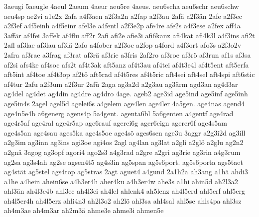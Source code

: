 {    3aeugi
    5aeugle
    4aeul
    2aeum
    4aeur
    aeu5re
    4aeus.
    aeu6scha
    aeu6schr
    aeu6schw
    aeu4sp
    ae2vi
    a1e2x
    2afa
    a4f3aen
    a2f3a2n
    a2fap
    a2f3au
    2afä
    a2f3än
    2afe
    a2f3ec
    a2f3ef
    a4f5einh
    a4f5einr
    afel3e
    a4fentl
    a2f3e2p
    afe4re
    afe2s
    a4f3ese
    a2fex
    aff4a
    3affär
    af4fei
    3affek
    af4flu
    aff2r
    2afi
    afi2e
    afie3i
    afi6kanz
    afi4kat
    afi4k3l
    a4f3ins
    afi2t
    2afl
    af3lae
    af3lau
    af3lä
    2afo
    a4fober
    a2f3oc
    a2fop
    a4ford
    a4f3ort
    afo3s
    a2f3o2v
    2afra
    af3rae
    a3frag
    af3rat
    af3rä
    af3rie
    a3fris
    2af2ro
    af3roe
    af3rö
    af3run
    af1s
    af3sa
    af2si
    afs4ke
    af4soc
    afs2t
    af4t3ak
    aft5anz
    af4t3au
    af4tei
    af4t3e4l
    af4t5ent
    aft5erfa
    aft5int
    af4toe
    af4t3op
    af2tö
    aft5rad
    af4t5res
    af4t5ric
    aft4sei
    aft4sel
    aft4spi
    aft6stic
    af4tur
    2afu
    a2f3um
    a2f3ur
    2afü
    2aga
    ag3a2d
    a2g3au
    ag3ärm
    agd3an
    ag4d3ar
    ag4del
    ag4det
    ag4din
    ag4dre
    ag4dro
    4age.
    ageb2
    age3id
    age5ind
    age5inf
    age5inh
    age5in4s
    2agel
    agel5d
    agelei6s
    a4gelem
    age4len
    age4ler
    4a5gen.
    age4nas
    agend4
    age4n5e4b
    a6generg
    agens4p
    5a4gent.
    agenta6bl
    5a6genten
    a4gentf
    age4rad
    age4r5af
    age4ral
    age4r5ap
    age6rauf
    agerei6g
    ager6eign
    agerer6f
    age4s5am
    age4s5an
    age4sau
    ages5ka
    age4s5oe
    age4sö
    ages6sen
    age3u
    3aggr
    a2g3i2d
    ag3ill
    a2g3im
    ag3inn
    ag3ins
    agi3oe
    agi4os
    2agl
    ag4lan
    ag3lat
    a2gli
    a2glö
    a2glu
    ag2n2
    a2gnä
    3agog
    ag3opf
    agori4
    ago2s3
    a4g3rad
    a2gre
    a2gri
    ag3rie
    ag3rin
    a4g3rum
    ag2sa
    ag3s4ah
    ag2se
    agsen4t5
    ag4s3in
    ag5span
    ag5s6port.
    ag5s6porta
    ags5taet
    ag4stät
    ag5stel
    ags4top
    ag5stras
    2agt
    aguet4
    a4gund
    2a1h2a
    ah3ang
    a1hä
    ahdi3
    a1he
    a4hein
    ahein6se
    a4h3er4h
    aher4ku
    a4h3er4w
    ahe3s
    a1hi
    ahin5d
    ah2l3a2
    ahl3än
    ah4l3e4b
    ahl3ec
    ah4l3ei
    ah4lel
    ahlenk4
    ah5lenz
    ah4l5erd
    ahl5erf
    ahl5erg
    ah4l5er4h
    ah4l5erz
    ahli4n3
    ah2l3o2
    ah2lö
    ahl3sa
    ahl4sal
    ahl5se
    ahls4pa
    ahl3sz
    ah4m3ae
    ah4m3ar
    ah2m3ä
    ahme3e
    ahme3i
    ahmen5e
}
